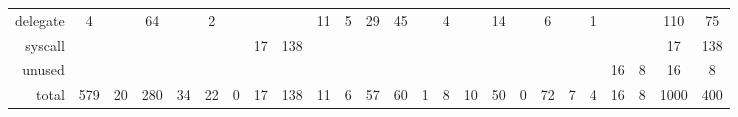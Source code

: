 \begin{table*}[!t]
\begin{adjustbox}{max width=\textwidth}
\begin{tabular}{r|cc|cc|cc|cc|cc|cc|cc|cc|cc|cc|cc|cc}
           delegate &    4 &      &   64 &      &    2 &      &       &      &     11 &    5 &   29 &   45 &      &    4 &        &   14 &       &    6 &         &    1 &        &      &   110 &   75 \\
\rowcolor{verylightgray}
            syscall &      &      &      &      &      &      &    17 &  138 &        &      &      &      &      &      &        &      &       &      &         &      &        &      &    17 &  138 \\
             unused &      &      &      &      &      &      &       &      &        &      &      &      &      &      &        &      &       &      &         &      &     16 &    8 &    16 &    8 \\ \hline
\rowcolor{verylightgray}
                  total &  579 &   20 &  280 &   34 &   22 &    0 &    17 &  138 &     11 &    6 &   57 &   60 &    1 &    8 &     10 &   50 &     0 &   72 &       7 &    4 &     16 &    8 &  1000 &  400 \\
\end{tabular}

    \end{adjustbox}
        \vspace{-10pt}
\end{table*}